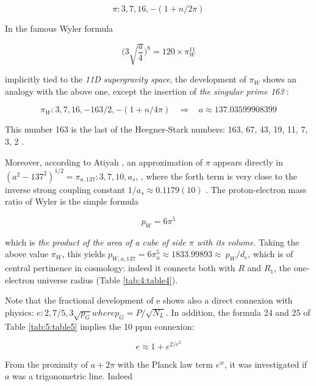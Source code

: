 \documentclass[a4paper,9pt]{article}
\begin{document}
\begin{equation}
\pi : 3, 7, 16, -(1+n/2\pi)
\end{equation}


In the famous Wyler formula \cite{Wyler} 

\begin{equation}
\big(3\sqrt{\frac{a}{4}} \big)^8 = 120 \times \pi_W^{11}
\end{equation}


implicitly tied to the \emph{11D supergravity space}, the development of  $\pi_W$ shows an analogy with the above one, except the insertion of \textit {the singular prime 163} :

\begin{equation}
\pi_W : 3, 7, 16,- 163/2, -(1+n/4\pi) ~~~~\Rightarrow ~~~~    a \approx 137.03599908399
\end{equation}


This number 163 is the last of the Heegner-Stark numbers: 163, 67, 43, 19, 11, 7, 3, 2 \cite{Stark}. 


Moreover, according to Atiyah \cite{Atiyah1}, an approximation of $\pi$ appears directly in $(a^2-137^2)^{1/2} = \pi_{a,137} : 3, 7, 10, a_s$, , where the forth term is very close to the inverse strong coupling constant $1/a_s \approx 0.1179(10)$ \cite{Tanabashi}. The proton-electron mass ratio of Wyler \cite{Wyler} is the simple formula 

\begin{equation}
 p_W = 6\pi^5    
\end{equation}

which is \textit {the product of the area of a cube of side $\pi$ with its volume}. Taking the above value $\pi_W$, this yields $p_{W, a, 137} = 6\pi_a^5 \approx 1833.99893 \approx\ p_W/d_e$, which is of central pertinence in cosmology: indeed it connects both with $R$ and $R_1$, the one-electron universe radius \cite{Sanchez} (Table \ref{tab:4:table4}).

Note that the fractional development of e shows also a direct connexion with physics: $e : 2, 7/5, 3\sqrt{p_G} where p_G = P/\sqrt {N_L}$. In addition, the formula 24 and 25 of Table \ref{tab:5:table5} implies the 10 ppm connexion:

\begin{equation}
 e \approx 1 + e^{2/e^2}    
\end{equation}

From the proximity of $a + 2\pi$ with the Planck law term $e^w$, it was investigated if $a$ was a trigonometric line. Indeed 
 
\end{document}
